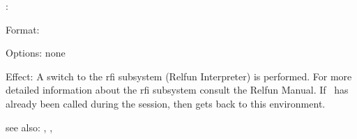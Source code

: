 \colab{} \rfi:

Format: 

Options: none

Effect: A switch to the rfi subsystem (Relfun Interpreter) is 
        performed. For more detailed information about the rfi 
        subsystem consult the Relfun Manual. 
	If \rfi \ has already been called during the \COLAB{} 
        session, then \COLAB{} gets back to this environment.
       
see also: \relfun, \rfe, \colab

